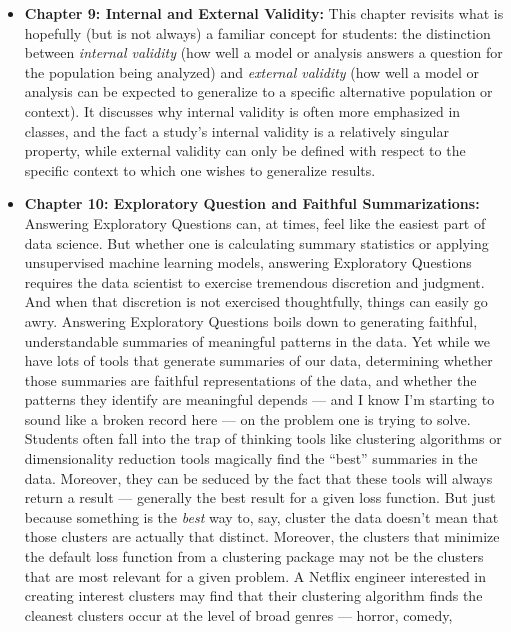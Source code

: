 \documentclass[12pt]{article}
\begin{document}
\begin{itemize}

\item
  \textbf{Chapter 9: Internal and External Validity:} This chapter
  revisits what is hopefully (but is not always) a familiar concept for
  students: the distinction between \emph{internal validity} (how well a
  model or analysis answers a question for the population being
  analyzed) and \emph{external validity} (how well a model or analysis
  can be expected to generalize to a specific alternative population or
  context). It discusses why internal validity is often more emphasized
  in classes, and the fact a study's internal validity is a relatively
  singular property, while external validity can only be defined with
  respect to the specific context to which one wishes to generalize
  results.
\item
  \textbf{Chapter 10: Exploratory Question and Faithful Summarizations:}
  Answering Exploratory Questions can, at times, feel like the easiest
  part of data science. But whether one is calculating summary
  statistics or applying unsupervised machine learning models, answering
  Exploratory Questions requires the data scientist to exercise
  tremendous discretion and judgment. And when that discretion is not
  exercised thoughtfully, things can easily go awry. Answering
  Exploratory Questions boils down to generating faithful,
  understandable summaries of meaningful patterns in the data. Yet while
  we have lots of tools that generate summaries of our data, determining
  whether those summaries are faithful representations of the data, and
  whether the patterns they identify are meaningful depends --- and I
  know I'm starting to sound like a broken record here --- on the
  problem one is trying to solve. Students often fall into the trap of
  thinking tools like clustering algorithms or dimensionality reduction
  tools magically find the ``best'' summaries in the data. Moreover,
  they can be seduced by the fact that these tools will always return a
  result --- generally the best result for a given loss function. But
  just because something is the \emph{best} way to, say, cluster the
  data doesn't mean that those clusters are actually that distinct.
  Moreover, the clusters that minimize the default loss function from a
  clustering package may not be the clusters that are most relevant for
  a given problem. A Netflix engineer interested in creating interest
  clusters may find that their clustering algorithm finds the cleanest
  clusters occur at the level of broad genres --- horror, comedy,

\end{itemize}
\end{document}
